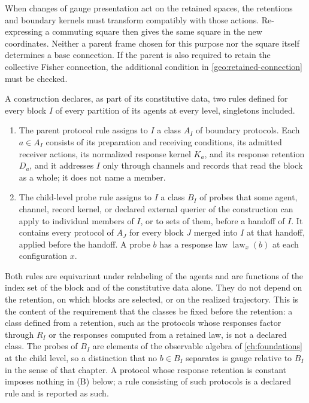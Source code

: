 When changes of gauge presentation act on the retained spaces, the
retentions and boundary kernels must transform compatibly with those
actions. Re-expressing a commuting square then gives the same square in
the new coordinates. Neither a parent frame chosen for this purpose nor
the square itself determines a base connection. If the parent is also
required to retain the collective Fisher connection, the additional
condition in \cref{geo:retained-connection} must be checked.

A construction declares, as part of its constitutive data, two rules defined
for every block $I$ of every partition of its agents at every level,
singletons included.
\begin{enumerate}
\item[(A)] The parent protocol rule assigns to $I$ a class $A_I$ of boundary
protocols. Each $a\in A_I$ consists of its preparation and receiving
conditions, its admitted receiver actions, its normalized response kernel
$K_a$, and its response retention $D_a$, and it addresses $I$ only through
channels and records that read the block as a whole; it does not name a
member.
\item[(P)] The child-level probe rule assigns to $I$ a class $B_I$ of
probes that some agent, channel, record kernel, or declared external
querier of the construction can apply to individual members of $I$, or to
sets of them, before a handoff of $I$. It contains every protocol of $A_J$
for every block $J$ merged into $I$ at that handoff, applied before the
handoff. A probe $b$ has a response law $\operatorname{law}_x(b)$ at each
configuration $x$.
\end{enumerate}
Both rules are equivariant under relabeling of the agents and are functions
of the index set of the block and of the constitutive data alone. They do
not depend on the retention, on which blocks are selected, or on the
realized trajectory. This is the content of the requirement that the
classes be fixed before the retention: a class defined from a retention,
such as the protocols whose responses factor through $R_I$ or the responses
computed from a retained law, is not a declared class. The probes of $B_I$
are elements of the observable algebra of \cref{ch:foundations} at the
child level, so a distinction that no $b\in B_I$ separates is gauge relative
to $B_I$ in the sense of that chapter. A protocol whose response retention
is constant imposes nothing in (B) below; a rule consisting of such
protocols is a declared rule and is reported as such.

